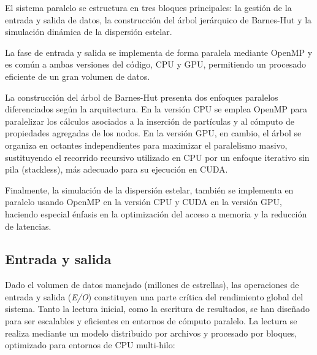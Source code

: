 El sistema paralelo se estructura en tres bloques principales: la gestión de la entrada y salida de datos, la construcción del árbol jerárquico de Barnes-Hut y la simulación dinámica de la dispersión estelar.

La fase de entrada y salida se implementa de forma paralela mediante OpenMP y es común a ambas versiones del código, CPU y GPU, permitiendo un procesado eficiente de un gran volumen de datos.

La construcción del árbol de Barnes-Hut presenta dos enfoques paralelos diferenciados según la arquitectura.
En la versión CPU se emplea OpenMP para paralelizar los cálculos asociados a la inserción de partículas y al cómputo de propiedades agregadas de los nodos.
En la versión GPU, en cambio, el árbol se organiza en octantes independientes para maximizar el paralelismo masivo, sustituyendo el recorrido recursivo utilizado en CPU por un enfoque iterativo sin pila (stackless), más adecuado para su ejecución en CUDA.

Finalmente, la simulación de la dispersión estelar, también se implementa en paralelo usando OpenMP en la versión CPU y CUDA en la versión GPU, haciendo especial énfasis en la optimización del acceso a memoria y la reducción de latencias.

\subsection{Entrada y salida}\label{subsec:lectura-de-archivos}

Dado el volumen de datos manejado (millones de estrellas), las operaciones de entrada y salida (\textit{E/O}) constituyen una parte crítica del rendimiento global del sistema.
Tanto la lectura inicial, como la escritura de resultados, se han diseñado para ser escalables y eficientes en entornos de cómputo paralelo.
La lectura se realiza mediante un modelo distribuido por archivos y procesado por bloques, optimizado para entornos de CPU multi-hilo:

